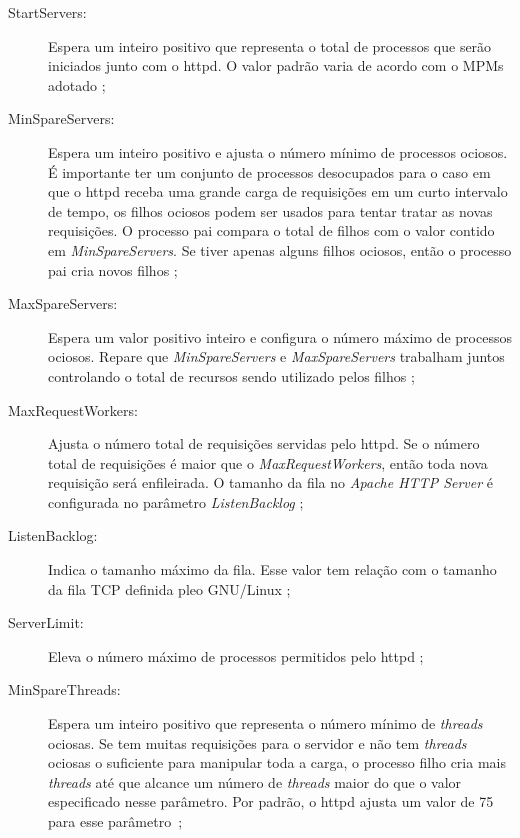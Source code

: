 \begin{description}
  \item [StartServers:]
Espera um inteiro positivo que representa o total de processos que serão
iniciados junto com o httpd.  O valor padrão varia de acordo com o MPMs adotado
\citep{mpm_start_server};

  \item [MinSpareServers:]
Espera um inteiro positivo e ajusta o número mínimo de processos ociosos. É
importante ter um conjunto de processos desocupados para o caso em que o httpd
receba uma grande carga de requisições em um curto intervalo de tempo, os
filhos ociosos podem ser usados para tentar tratar as novas requisições. O
processo pai compara o total de filhos com o valor contido em
\textit{MinSpareServers}. Se tiver apenas alguns filhos ociosos, então o
processo pai cria novos filhos \citep{mpm_min_spare};

  \item [MaxSpareServers:]
Espera um valor positivo inteiro e configura o número máximo de processos
ociosos. Repare que \textit{MinSpareServers} e \textit{MaxSpareServers}
trabalham juntos controlando o total de recursos sendo utilizado pelos filhos
\citep{mpm_max_spare};

  \item [MaxRequestWorkers:]
Ajusta o número total de requisições servidas pelo httpd. Se o número total de
requisições é maior que o \textit{MaxRequestWorkers}, então toda nova
requisição será enfileirada. O tamanho da fila no \emph{Apache HTTP Server} é configurada no
parâmetro \textit{ListenBacklog} \citep{mpm_max_request};

  \item [ListenBacklog:]
Indica o tamanho máximo da fila.  Esse valor tem relação com o
tamanho da fila TCP definida pleo GNU/Linux \citep{mpm_listen};

  \item [ServerLimit:]
Eleva o número máximo de processos permitidos pelo httpd
\citep{mpm_server_limit};

  \item [MinSpareThreads:]
Espera um inteiro positivo que representa o número mínimo de \emph{threads} ociosas.
Se tem muitas requisições para o servidor e não tem \emph{threads} ociosas o
suficiente para manipular toda a carga, o processo filho cria mais \emph{threads} até
que alcance um número de \emph{threads} maior do que o valor especificado nesse
parâmetro.  Por padrão, o httpd ajusta um valor de 75 para esse
parâmetro~\citep{mpm_minsparethreads};


\end{description}
